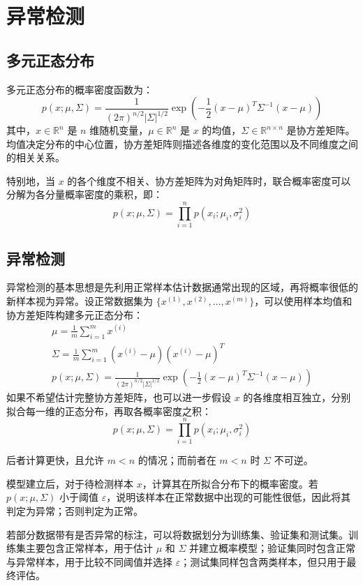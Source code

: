 \section{异常检测}
\label{sec:chapter13}

\subsection{多元正态分布}

多元正态分布的概率密度函数为：
\[
p(x;\mu,\Sigma)=\frac{1}{(2\pi)^{n/2}|\Sigma|^{1/2}}\exp\left(-\frac{1}{2}(x-\mu)^T\Sigma^{-1}(x-\mu)\right)
\]
其中，$x\in\mathbb R^n$ 是 $n$ 维随机变量，$\mu\in\mathbb R^n$ 是 $x$ 的均值，$\Sigma\in\mathbb R^{n\times n}$ 是协方差矩阵。均值决定分布的中心位置，协方差矩阵则描述各维度的变化范围以及不同维度之间的相关关系。

特别地，当 $x$ 的各个维度不相关、协方差矩阵为对角矩阵时，联合概率密度可以分解为各分量概率密度的乘积，即：
\[
p(x;\mu,\Sigma)=\prod_{i=1}^np(x_i;\mu_i,\sigma_i^2)
\]


\subsection{异常检测}

异常检测的基本思想是先利用正常样本估计数据通常出现的区域，再将概率很低的新样本视为异常。设正常数据集为 $\{x^{(1)},x^{(2)},\ldots,x^{(m)}\}$，可以使用样本均值和协方差矩阵构建多元正态分布：
\begin{gather*}
\mu=\frac{1}{m}\sum\limits_{i=1}^mx^{(i)}\\
\Sigma=\frac{1}{m}\sum\limits_{i=1}^m(x^{(i)}-\mu)(x^{(i)}-\mu)^T\\
p(x;\mu,\Sigma)=\frac{1}{(2\pi)^{n/2}|\Sigma|^{1/2}}\exp\left(-\frac{1}{2}(x-\mu)^T\Sigma^{-1}(x-\mu)\right)
\end{gather*}
如果不希望估计完整协方差矩阵，也可以进一步假设 $x$ 的各维度相互独立，分别拟合每一维的正态分布，再取各概率密度之积：
\[
p(x;\mu,\Sigma)=\prod_{i=1}^np(x_i;\mu_i,\sigma_i^2)
\]

\begin{note}
后者计算更快，且允许 $m<n$ 的情况；而前者在 $m<n$ 时 $\Sigma$ 不可逆。
\end{note}

模型建立后，对于待检测样本 $x$，计算其在所拟合分布下的概率密度。若 $p(x;\mu,\Sigma)$ 小于阈值 $\varepsilon$，说明该样本在正常数据中出现的可能性很低，因此将其判定为异常；否则判定为正常。

若部分数据带有是否异常的标注，可以将数据划分为训练集、验证集和测试集。训练集主要包含正常样本，用于估计 $\mu$ 和 $\Sigma$ 并建立概率模型；验证集同时包含正常与异常样本，用于比较不同阈值并选择 $\varepsilon$；测试集同样包含两类样本，但只用于最终评估。

